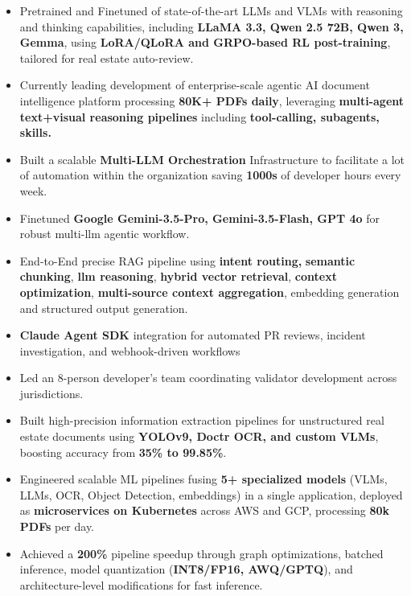 \documentclass[a4paper]{article}
\begin{document}
\begin{itemize} \itemsep 1pt
  \item Pretrained and Finetuned of state-of-the-art LLMs and VLMs with reasoning and thinking capabilities, including \textbf{LLaMA 3.3, Qwen 2.5 72B, Qwen 3, Gemma}, using \textbf{LoRA/QLoRA and GRPO-based RL post-training}, tailored for real estate auto-review.
  \item Currently leading development of enterprise-scale agentic AI document intelligence platform processing \textbf{80K+ PDFs daily}, leveraging \textbf{multi-agent text+visual reasoning pipelines} including\textbf{ tool-calling, subagents, skills.}
  \item Built a scalable \textbf{Multi-LLM Orchestration} Infrastructure to facilitate a lot of automation within the organization saving \textbf{1000s }of developer hours every week.
  \item Finetuned \textbf{Google Gemini-3.5-Pro, Gemini-3.5-Flash, GPT 4o} for robust multi-llm agentic workflow.
  \item End-to-End precise RAG pipeline using \textbf{intent routing,} \textbf{semantic chunking}, \textbf{llm reasoning},  \textbf{hybrid vector retrieval}, \textbf{context optimization}, \textbf{multi-source context aggregation},  embedding generation and structured output generation.
  \item \textbf{Claude Agent SDK} integration for automated PR reviews, incident investigation, and webhook-driven workflows
  \item Led an 8-person developer's team coordinating validator development across jurisdictions.
  \item   Built high-precision information extraction pipelines for unstructured real estate documents using \textbf{YOLOv9, Doctr OCR, and custom VLMs}, boosting accuracy from \textbf{35\% to 99.85\%}.
  \item Engineered scalable ML pipelines fusing \textbf{5+ specialized models} (VLMs, LLMs, OCR, Object Detection, embeddings) in a single application, deployed as \textbf{microservices on Kubernetes} across AWS and GCP, processing \textbf{80k} \textbf{PDFs} per day.
  \item Achieved a \textbf{200\%} pipeline speedup through graph optimizations, batched inference, model quantization (\textbf{INT8/FP16, AWQ/GPTQ}), and architecture-level modifications for fast inference.

\end{itemize}
\end{document}
